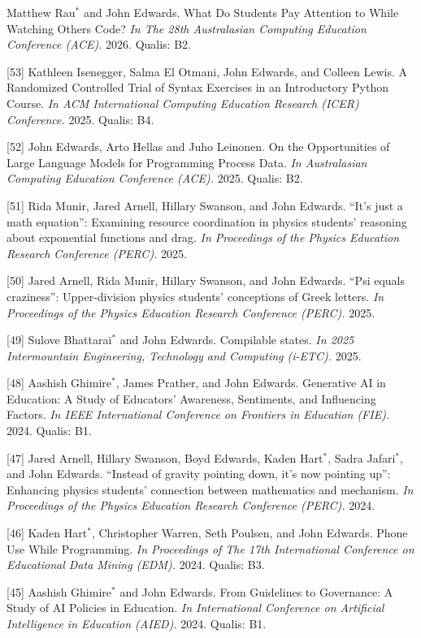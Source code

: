 \documentclass[margin,line]{res}
\newcommand{\cnum}[1]{[#1]}
\begin{document}
\begin{resume}
\cnum{54} Matthew Rau$^*$ and John Edwards. What Do Students Pay Attention to While Watching Others Code? \textit{In The 28th Australasian Computing Education Conference (ACE).} 2026. Qualis: B2.

\cnum{53} Kathleen Isenegger, Salma El Otmani, John Edwards, and Colleen Lewis. A Randomized Controlled Trial of Syntax Exercises in an Introductory Python Course. \textit{In ACM International Computing Education Research (ICER) Conference.} 2025. Qualis: B4.

\cnum{52} John Edwards, Arto Hellas and Juho Leinonen. On the Opportunities of Large Language Models for Programming Process Data. \textit{In Australasian Computing Education Conference (ACE).} 2025. Qualis: B2.

\cnum{51} Rida Munir, Jared Arnell, Hillary Swanson, and John Edwards. ``It's just a math equation'': Examining resource coordination in physics students' reasoning about exponential functions and drag. \textit{In Proceedings of the Physics Education Research Conference (PERC).} 2025.

\cnum{50} Jared Arnell, Rida Munir, Hillary Swanson, and John Edwards. ``Psi equals craziness'': Upper-division physics students' conceptions of Greek letters. \textit{In Proceedings of the Physics Education Research Conference (PERC).} 2025.

\cnum{49} Sulove Bhattarai$^*$ and John Edwards. Compilable states. \textit{In 2025 Intermountain Engineering, Technology and Computing (i-ETC).} 2025.

\cnum{48} Aashish Ghimire$^*$, James Prather, and John Edwards. Generative AI in Education: A Study of Educators’ Awareness, Sentiments, and Influencing Factors. \textit{In IEEE International Conference on Frontiers in Education (FIE).} 2024. Qualis: B1.

\cnum{47} Jared Arnell, Hillary Swanson, Boyd Edwards, Kaden Hart$^*$, Sadra Jafari$^*$, and John Edwards. ``Instead of gravity pointing down, it’s now pointing up'': Enhancing physics students' connection between mathematics and mechanism. \textit{In Proceedings of the Physics Education Research Conference (PERC).} 2024.

\cnum{46} Kaden Hart$^*$, Christopher Warren, Seth Poulsen, and John Edwards. Phone Use While Programming. \textit{In Proceedings of The 17th International Conference on Educational Data Mining (EDM).} 2024. Qualis: B3.

\cnum{45} Aashish Ghimire$^*$ and John Edwards. From Guidelines to Governance: A Study of AI Policies in Education. \textit{In International Conference on Artificial Intelligence in Education (AIED).} 2024. Qualis: B1.


\end{resume}
\end{document}
